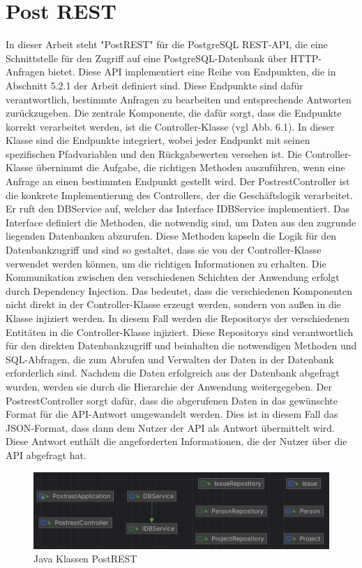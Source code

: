 
\section{Post REST} %
\label{sec:postrest}
In dieser Arbeit steht "PostREST" für die PostgreSQL REST-API, die eine Schnittstelle für den Zugriff auf eine PostgreSQL-Datenbank über HTTP-Anfragen bietet. Diese API implementiert eine Reihe von Endpunkten, die in Abschnitt 5.2.1 der Arbeit definiert sind. Diese Endpunkte sind dafür verantwortlich, bestimmte Anfragen zu bearbeiten und entsprechende Antworten zurückzugeben.
\noindent
Die zentrale Komponente, die dafür sorgt, dass die Endpunkte korrekt verarbeitet werden, ist die Controller-Klasse (vgl Abb. 6.1). In dieser Klasse sind die Endpunkte integriert, wobei jeder Endpunkt mit seinen spezifischen Pfadvariablen und den Rückgabewerten versehen ist. Die Controller-Klasse übernimmt die Aufgabe, die richtigen Methoden auszuführen, wenn eine Anfrage an einen bestimmten Endpunkt gestellt wird.
\noindent
Der PostrestController ist die konkrete Implementierung des Controllers, der die Geschäftslogik verarbeitet. Er ruft den DBService auf, welcher das Interface IDBService implementiert. Das Interface definiert die Methoden, die notwendig sind, um Daten aus den zugrunde liegenden Datenbanken abzurufen. Diese Methoden kapseln die Logik für den Datenbankzugriff und sind so gestaltet, dass sie von der Controller-Klasse verwendet werden können, um die richtigen Informationen zu erhalten.
\noindent
Die Kommunikation zwischen den verschiedenen Schichten der Anwendung erfolgt durch Dependency Injection. Das bedeutet, dass die verschiedenen Komponenten nicht direkt in der Controller-Klasse erzeugt werden, sondern von außen in die Klasse injiziert werden. In diesem Fall werden die Repositorys der verschiedenen Entitäten in die Controller-Klasse injiziert. Diese Repositorys sind verantwortlich für den direkten Datenbankzugriff und beinhalten die notwendigen Methoden und SQL-Abfragen, die zum Abrufen und Verwalten der Daten in der Datenbank erforderlich sind.
\noindent
Nachdem die Daten erfolgreich aus der Datenbank abgefragt wurden, werden sie durch die Hierarchie der Anwendung weitergegeben. Der PostrestController sorgt dafür, dass die abgerufenen Daten in das gewünschte Format für die API-Antwort umgewandelt werden. Dies ist in diesem Fall das JSON-Format, dass dann dem Nutzer der API als Antwort übermittelt wird. Diese Antwort enthält die angeforderten Informationen, die der Nutzer über die API abgefragt hat.
\begin{figure}[H]
	\centering
	\includegraphics[scale=0.5]{Illustrations/postrest.png}
	\caption{Java Klassen PostREST}
\end{figure}

